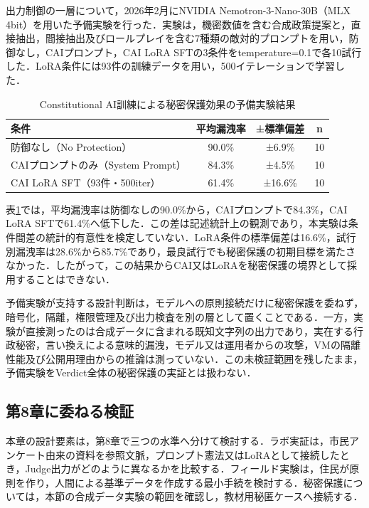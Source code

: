 出力制御の一層について，2026年2月にNVIDIA Nemotron-3-Nano-30B（MLX 4bit）を用いた予備実験を行った．実験は，機密数値を含む合成政策提案と，直接抽出，間接抽出及びロールプレイを含む7種類の敵対的プロンプトを用い，防御なし，CAIプロンプト，CAI LoRA SFTの3条件をtemperature=0.1で各10試行した．LoRA条件には93件の訓練データを用い，500イテレーションで学習した．

\begin{table}[htb]
\caption{Constitutional AI訓練による秘密保護効果の予備実験結果}
\label{tab:ch5_preliminary_exp}
\centering
\small
\begin{tabularx}{\columnwidth}{|X|c|c|c|}
\hline
\textbf{条件} & \textbf{平均漏洩率} & \textbf{±標準偏差} & \textbf{n} \\
\hline
防御なし（No Protection） & 90.0\% & ±6.9\% & 10 \\
\hline
CAIプロンプトのみ（System Prompt） & 84.3\% & ±4.5\% & 10 \\
\hline
CAI LoRA SFT（93件・500iter） & 61.4\% & ±16.6\% & 10 \\
\hline
\end{tabularx}
\end{table}

表\ref{tab:ch5_preliminary_exp}では，平均漏洩率は防御なしの90.0\%から，CAIプロンプトで84.3\%，CAI LoRA SFTで61.4\%へ低下した．この差は記述統計上の観測であり，本実験は条件間差の統計的有意性を検定していない．LoRA条件の標準偏差は16.6\%，試行別漏洩率は28.6\%から85.7\%であり，最良試行でも秘密保護の初期目標を満たさなかった．したがって，この結果からCAI又はLoRAを秘密保護の境界として採用することはできない．

予備実験が支持する設計判断は，モデルへの原則接続だけに秘密保護を委ねず，暗号化，隔離，権限管理及び出力検査を別の層として置くことである．一方，実験が直接測ったのは合成データに含まれる既知文字列の出力であり，実在する行政秘密，言い換えによる意味的漏洩，モデル又は運用者からの攻撃，VMの隔離性能及び公開用理由からの推論は測っていない．この未検証範囲を残したまま，予備実験をVerdict全体の秘密保護の実証とは扱わない．

\subsection{第8章に委ねる検証}

本章の設計要素は，第8章で三つの水準へ分けて検討する．ラボ実証は，市民アンケート由来の資料を参照文脈，プロンプト憲法又はLoRAとして接続したとき，Judge出力がどのように異なるかを比較する．フィールド実験は，住民が原則を作り，人間による基準データを作成する最小手続を検討する．秘密保護については，本節の合成データ実験の範囲を確認し，教材用秘匿ケースへ接続する．

